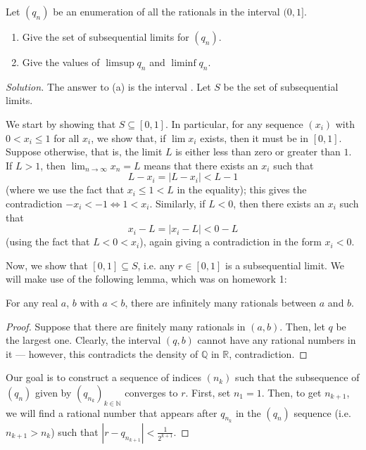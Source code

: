 \documentclass[11pt]{scrartcl}
\providecommand{\NN}{\mathbb N}
\providecommand{\QQ}{\mathbb Q}
\providecommand{\RR}{\mathbb R}
\providecommand{\ii}{\item}
\theoremstyle{problem}
\newenvironment{problem}[1]
{\renewcommand\theinnercustomthm{#1}\innercustomthm}
{\endinnercustomthm}
\theoremstyle{remark}
\newenvironment{soln}{\begin{proof}[Solution]}{\end{proof}}
\begin{document}
\pagebreak
\begin{problem}{11.5}
	Let $(q_n)$ be an enumeration of all the rationals in the interval $(0, 1]$.
	\begin{enumerate}[\emph{\textbf{(\alph*)}}]
		\ii Give the set of subsequential limits for $(q_n)$.
		\ii Give the values of $\limsup q_n$ and $\liminf q_n$.
	\end{enumerate}
\end{problem}

\begin{soln}
	The answer to (a) is the interval \framebox{$[0,1]$}.
	Let $S$ be the set of subsequential limits.
	
	We start by showing that $S\subseteq[0,1]$.
	In particular, for any sequence $(x_i)$ with $0 < x_i \le 1$ for all $x_i$,
	we show that, if $\lim x_i$ exists, then it must be in $[0, 1]$.
	Suppose otherwise, that is, the limit $L$ is either less than zero
	or greater than $1$. If $L > 1$, then $\lim_{n\to\infty} x_n = L$
	means that there exists an $x_i$ such that
	\[L - x_i = |L - x_i| < L - 1\]
	(where we use the fact that $x_i \le 1 < L$ in the equality);
	this gives the contradiction $-x_i < -1 \iff 1 < x_i$.
	Similarly, if $L < 0$, then there exists an $x_i$ such that
	\[x_i - L = |x_i - L| < 0 - L\]
	(using the fact that $L < 0 < x_i$),
	again giving a contradiction in the form $x_i < 0$.
	
	Now, we show that $[0, 1]\subseteq S$, i.e. any $r\in[0, 1]$
	is a subsequential limit.
	We will make use of the following lemma,
	which was on homework 1:
	\begin{lemma*}
		For any real $a$, $b$ with $a < b$,
		there are infinitely many rationals between $a$ and $b$.
	\end{lemma*}
	\begin{proof}
		Suppose that there are finitely many rationals in $(a, b)$.
		Then, let $q$ be the largest one. Clearly, the interval $(q, b)$
		cannot have any rational numbers in it --- however,
		this contradicts the density of $\QQ$ in $\RR$, contradiction.
	\end{proof}

	Our goal is to construct a sequence of indices $(n_k)$
	such that the subsequence of $(q_n)$ given by $(q_{n_k})_{k\in\NN}$
	converges to $r$. First, set $n_1 = 1$.
	Then, to get $n_{k+1}$, we will find a rational number
	that appears after $q_{n_k}$ in the $(q_n)$ sequence (i.e. $n_{k+1} > n_k$)
	such that $|r - q_{n_{k+1}}| < \frac{1}{2^{k+1}}$.
	

\end{soln}
\end{document}
